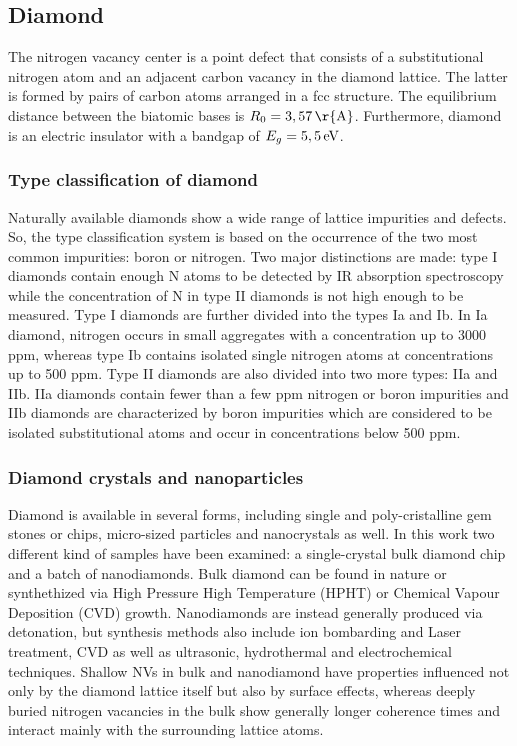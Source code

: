 \documentclass[12pt,a4paper]{article}
\begin{document}
\subsection{Diamond}
The nitrogen vacancy center is a point defect that consists of a substitutional nitrogen atom and an adjacent carbon vacancy in the diamond lattice. The latter is formed by pairs of carbon atoms arranged in a fcc structure. The equilibrium distance between the biatomic bases is $R_0=\unit[3,57]{\r{A}}$. Furthermore, diamond is an electric insulator with a bandgap of $E_g=\unit[5,5]{eV}$\cite{gmf}.
\subsubsection{Type classification of diamond}
Naturally available diamonds show a wide range of lattice impurities and defects. So, the type classification system is based on the occurrence of the two most common impurities: boron or nitrogen. Two major distinctions are made: type I diamonds contain enough N atoms to be detected by IR absorption spectroscopy while the concentration of N in type II diamonds is not high enough to be measured\cite{pod}. Type I diamonds are further divided into the types Ia and Ib. In Ia diamond, nitrogen occurs in small aggregates with a concentration up to 3000 ppm, whereas type Ib contains isolated single nitrogen atoms at concentrations up to 500 ppm\cite{mspd}. 
Type II diamonds are also divided into two more types: IIa and IIb. IIa diamonds contain fewer than a few ppm nitrogen or boron impurities and IIb diamonds are characterized by boron impurities which are considered to be isolated substitutional atoms and occur in concentrations below 500 ppm\cite{pod}\cite{cod}\cite{darm}\cite{opdadh}.
\subsubsection{Diamond crystals and nanoparticles}
Diamond is available in several forms, including single  and poly-cristalline gem stones or chips, micro-sized particles and nanocrystals as well. In this work two different kind of samples have been examined: a single-crystal bulk diamond chip and a  batch of nanodiamonds. Bulk diamond can be found in nature or synthethized via High Pressure High Temperature (HPHT) or Chemical Vapour Deposition (CVD) growth\cite{dgcvd}\cite{hpht}. Nanodiamonds are instead generally produced via detonation, but synthesis methods also include ion bombarding and Laser treatment, CVD as well as ultrasonic, hydrothermal and electrochemical techniques\cite{st}\cite{nd}. Shallow NVs in bulk and nanodiamond  have properties influenced not only by the diamond lattice itself but also by surface effects, whereas deeply buried nitrogen vacancies in the bulk show generally longer coherence times and interact mainly with the surrounding lattice atoms.
\end{document}
